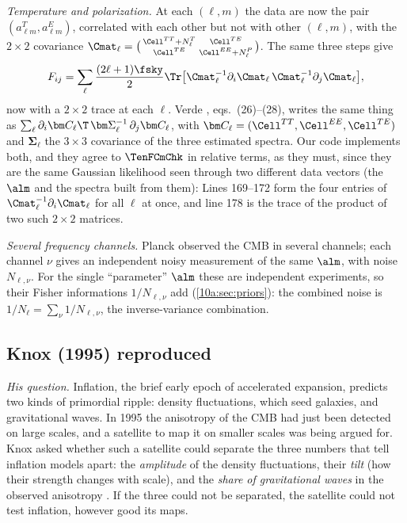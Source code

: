 \emph{Temperature and polarization.} At each $(\ell,m)$ the data are now the pair $(a^T_{\ell m},a^E_{\ell m})$, correlated with
each other but not with other $(\ell,m)$, with the $2\times2$ covariance
$\Cmat_\ell=\bigl(\begin{smallmatrix}\Cell^{TT}+N_\ell^T&\Cell^{TE}\\ \Cell^{TE}&\Cell^{EE}+N_\ell^P\end{smallmatrix}\bigr)$. The same three steps give
\begin{equation}
  F_{ij}=\sum_\ell\frac{(2\ell+1)\fsky}{2}\Tr\bigl[\Cmat_\ell^{-1}\partial_i\Cmat_\ell\,\Cmat_\ell^{-1}\partial_j\Cmat_\ell\bigr],
  \label{10a:eq:cmb-fisher-TE}
\end{equation}
now with a $2\times2$ trace at each $\ell$. Verde \cite{Verde2010}, eqs.~(26)--(28), writes the same thing as
$\sum_\ell\partial_i\bm C_\ell\T\,\bm\Sigma_\ell^{-1}\,\partial_j\bm C_\ell$, with $\bm C_\ell=(\Cell^{TT},\Cell^{EE},\Cell^{TE})$ and $\bm\Sigma_\ell$ the $3\times3$ covariance
of the three estimated spectra. Our code implements both, and they agree to $\TenFCmChk$ in relative terms,
as they must, since they are the same Gaussian likelihood seen through two different data vectors (the
$\alm$ and the spectra built from them):
Lines 169--172 form the four entries of $\Cmat_\ell^{-1}\partial_i\Cmat_\ell$ for all $\ell$ at once, and line 178 is the trace of
the product of two such $2\times2$ matrices.

\emph{Several frequency channels.} Planck observed the CMB in several channels; each channel $\nu$ gives an
independent noisy measurement of the same $\alm$, with noise $N_{\ell,\nu}$. For the single ``parameter'' $\alm$ these
are independent experiments, so their Fisher informations $1/N_{\ell,\nu}$ add (\cref{10a:sec:priors}): the combined
noise is $1/N_\ell=\sum_\nu1/N_{\ell,\nu}$, the inverse-variance combination.

\subsection{Knox (1995) reproduced}
\label{10a:sec:knox}

\emph{His question.} Inflation, the brief early epoch of accelerated expansion, predicts two kinds of primordial
ripple: density fluctuations, which seed galaxies, and gravitational waves. In 1995 the anisotropy of the CMB
had just been detected on large scales, and a satellite to map it on smaller scales was being argued for. Knox
asked whether such a satellite could separate the three numbers that tell inflation models apart: the
\emph{amplitude} of the density fluctuations, their \emph{tilt} (how their strength changes with scale), and the
\emph{share of gravitational waves} in the observed anisotropy \cite{Knox1995}. If the three could not be
separated, the satellite could not test inflation, however good its maps.

